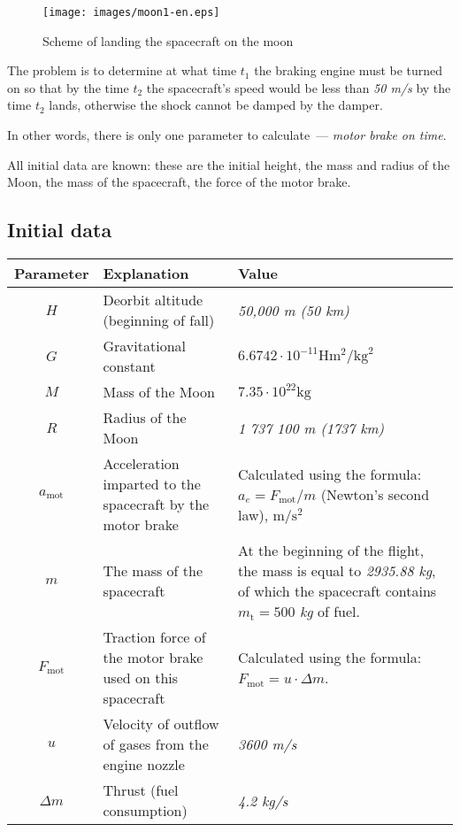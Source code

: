 \documentclass[12pt,a4paper]{article}
\begin{document}
\begin{figure}[tbh]
  \begin{center}
    \texttt{[image: images/moon1-en.eps]}
    \caption{Scheme of landing the spacecraft on the moon}
    \label{Pic:moon1}
  \end{center}
\end{figure}

The problem is to determine at what time $ t_1 $ the braking engine must be turned on so that by the time $ t_2 $ the spacecraft's speed would be less than \emph{50 m/s} by the time $ t_2 $ lands, otherwise the shock cannot be damped by the damper.

In other words, there is only one parameter to calculate~--- \emph{motor brake on time}.

All initial data are known: these are the initial height, the mass and radius of the Moon, the mass of the spacecraft, the force of the motor brake.

\subsection{Initial data}

\begin{center}
\begin{tabular}{ |c|p{6cm}|p{6cm}| }
  \hline
  \textbf{Parameter} & \textbf{Explanation} & \textbf{Value} \\
  \hline
  $ H $ & Deorbit altitude (beginning of fall) & \emph{50,000 m (50 km)} \\
  \hline
    $ G $ & Gravitational constant & $ 6.6742 \cdot 10^{-11} \text{H} \text{m}^{2}/\text{kg}^{2} $ \\
  \hline
    $ M $ & Mass of the Moon & $7.35 \cdot 10^{22} \text{kg}$ \\
   \hline
   $ R $ & Radius of the Moon & \emph{1 737 100 m (1737 km)} \\
   \hline
   $ a_{\text{mot}} $ & Acceleration imparted to the spacecraft by the motor brake & Calculated using the formula:
   $ a_{e} = F_{\text{mot}} / m $ (Newton's second law), $ \text{m}/\text{s}^2 $ \\
   \hline
   $ m $ & The mass of the spacecraft & At the beginning of the flight, the mass is equal to \emph{2935.88 kg}, of which the spacecraft
   contains $m_{\text{t}} = 500 $ \emph{kg} of fuel.\\
   \hline
   $ F_{\text{mot}} $ & Traction force of the motor brake used on this spacecraft &
   Calculated using the formula: $ F_{\text{mot}} = u \cdot \Delta m$.\\
   \hline
   $ u $ & Velocity of outflow of gases from the engine nozzle & \emph{3600 m/s}\\
   \hline
   $ \Delta m $ & Thrust (fuel consumption) & \emph{4.2 kg/s}\\
   \hline
\end{tabular}
\end{center}
\end{document}
